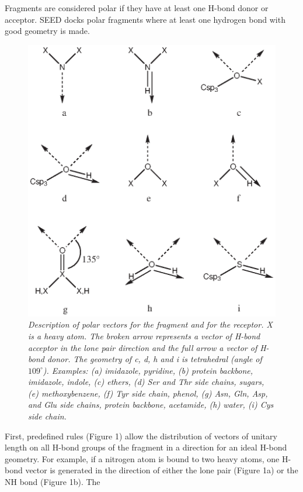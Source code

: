 \documentclass[a4paper,12pt,titlepage]{article}
\begin{document}
Fragments are considered polar if they have at least one H-bond donor or acceptor. SEED docks polar 
fragments where at least one hydrogen bond with good geometry is made. 
\begin{figure}[h]
\begin{center}
\includegraphics[scale=0.7]{figures/fig1.ps}
\end{center}
\caption{\it
Description of polar vectors for the fragment and for the receptor. X is a 
heavy atom. The broken arrow represents a vector of H-bond acceptor in the 
lone pair direction and the full arrow a vector of H-bond donor. 
The geometry of c, d, h and i is tetrahedral (angle of $109^\circ$). 
Examples: (a) imidazole, pyridine, (b) protein backbone, imidazole, indole, 
(c) ethers, (d) Ser and Thr side chains, sugars, (e) methoxybenzene, (f) Tyr side 
chain, phenol, (g) Asn, Gln, Asp, and Glu side chains, protein backbone, 
acetamide, (h) water, (i) Cys side chain.
}
\end{figure} 
First, predefined rules (Figure 1) 
allow the distribution of vectors of unitary length on all H-bond groups of the fragment in a direction 
for an ideal H-bond geometry. For example, if a nitrogen atom is bound to two heavy atoms, one H-bond 
vector is generated in the direction of either the lone pair (Figure 1a) or the NH bond (Figure 1b). The 
\end{document}
